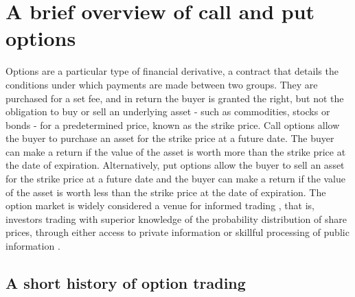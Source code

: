 \section{A brief overview of call and put options}

Options are a particular type of financial derivative, a contract that details the conditions under which payments are made between two groups. They are purchased for a set fee, and in return the buyer is granted the right, but not the obligation to buy or sell an underlying asset - such as commodities, stocks or bonds - for a predetermined price, known as the strike price.
\nline
Call options allow the buyer to purchase an asset for the strike price at a future date. The buyer can make a return if the value of the asset is worth more than the strike price at the date of expiration. Alternatively, put options allow the buyer to sell an asset for the strike price at a future date and the buyer can make a return if the value of the asset is worth less than the strike price at the date of expiration.
\nline
The option market is widely considered a venue for informed trading \cite{li2021effect,hu2014,chak2004}, that is, investors trading with superior knowledge of the probability distribution of share prices, through either access to private information or skillful processing of public information \cite{grossman1975application}. 

\subsection{A short history of option trading}

